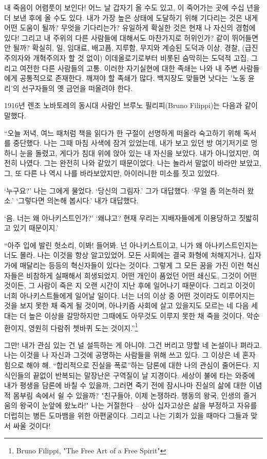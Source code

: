 \documentclass[11pt, b6paper, openany]{memoir}
\begin{document}
\begin{article}
내 죽음이 어렴풋이 보인다! 어느 날 갑자기 올 수도 있고, 이 죽어가는 곳에 수십 년을 더 보낸 후에 올 수도 있다. 내가 가장 높은 상태에 도달하기 위해 기다리는 것은 내게 어떤 도움이 될까? 무엇을 기다리는가? 유일하게 확실한 것은 현재 나 자신의 경험에 있다! 그리고 내 주위의 다른 사람들에 대해서도 마찬가지로 허위인가? 같이 뛰어들면 안 될까? 확실히, 일, 임대료, 배고픔, 지루함, 무지와 계승된 도덕과 이상, 경찰, (급진주의자와 개혁주의자 할 것 없이) 이데올로기로부터 비롯된 숨막히는 도덕적 고집, 그리고 여전한 다른 사람들의 고통. 이러한 자기실현에 대한 족쇄는 나와 내 주변 사람들에게 공통적으로 존재한다. 깨져야 할 족쇄가 많다. 백지장도 맞들면 낫다는 '노동 윤리'의 선구자들의 옛 금언을 떠올려야 한다.

1916년 렌조 노바토레의 동시대 사람인 브루노 필리피(Bruno Filippi)는 다음과 같이 말했다.

    “오늘 저녁, 여느 때처럼 책을 읽다가 한 구절이 선명하게 떠올라 숙고하기 위해 독서를 중단했다. 나는 그때 마침 사색에 잠겨 있었는데, 내가 보고 있던 방 여기저기로 멍하니 눈을 돌렸고, 게다가 침대 위에 앉아 있는 내 자신을 보았다. 내가 아니었지만, 여전히 나였다. 그는 완전히 나와 같았기 때문이었다. 나는 놀라서 말없이 바라만 보았고, 그, 또 다른 나 역시 나를 바라보았지만, 아이러니한 미소를 짓고 있었다. 

    ‘누구요?’ 나는 그에게 물었다. ‘당신의 그림자.’ 그가 대답했다. ‘무얼 좀 의논하러 왔소.’ ‘그렇다면 의논해 봅시다.’ 내가 대답했다. 

    ‘음. 너는 왜 아나키스트인가?’ ‘왜냐고? 현재 우리는 지배자들에게 이용당하고 짓밟히고 있기 때문이지.’ 

    “아주 입에 발린 헛소리, 이봐! 들어봐. 넌 아나키스트이고, 니가 왜 아나키스트인지는 너도 몰라. 나는 이것을 항상 알고있었어. 모든 사회에는 결국 화형에 처해지거나, 십자가에 매달리는 등등의 혁신자들이 있다는 것이다. 그렇게 그 모든 꿈을 가진 이런 혁신자들은 비참하게 실패해서 희생되었지. 어떤 개인이 품었던 어떤 쇄신도, 그것이 어떤 것이든, 그 사람이 죽은 지 오랜 시간이 지난 후에 일어나기 때문이다. 그리고 이것이 너희 아나키스트들에게 일어날 일이다. 너는 너의 이상 중 어떤 것이라도 이루어지는 것을 보지 못한 채 죽게 될 것이며, 아나키즘 사회에 살고 있을지도 모르는 네 다음 세대는 더 높은 이상을 갈망하지만 그때에도 아무것도 이루지 못한 채 죽을 것이다. 악순환이지, 영원히 다람쥐 쳇바퀴 도는 것이지.”\footnote{Bruno Filippi, "The Free Art of a Free Spirit"}

그만! 내가 관심 있는 건 널 설득하는 게 아니야. 그건 버리고 망할 네 논설이나 펴라고. 나는 이것을 나 자신과 그것에 공명하는 사람들을 위해 쓰고 있다. 그 이상은 네 혼자 힘으로 해야 해. “합리적으로 진실을 폭로”하는 담론에 대한 나의 관심이 줄어든다. 지식인들의 끝없이 반복되는 말장난은 구역질이 날 지경이다. 세상이 불에 타는 와중에 내가 평생을 담론에 바칠 수 있을까, 그러면 죽기 전에 잠시나마 진실의 삶에 대한 이념적 몸부림 속에서 쉴 수 있을까? "친구들아, 이제 논쟁하라. 행동의 왕국, 인생의 즐거움의 왕국이 눈앞에 왔노라!" 나는 거절한다 – 상아 십자고상은 삶을 부정하고 자유를 더럽히는 병든 도마뱀을 위한 아편굴이다. 그리고 나는 기회가 있을 때마다 그들과 맞서 싸울 것이다!


\end{article}
\end{document}
